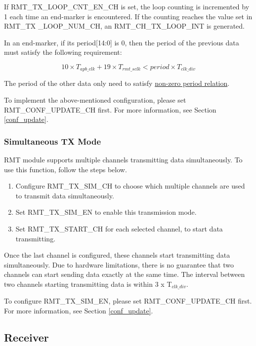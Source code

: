 \documentclass[main\_\_EN.tex]{subfiles}
\begin{document}
If RMT\_TX\_LOOP\_CNT\_EN\_CH is set, the loop counting is incremented by 1 each time an end-marker is encountered. If the counting reaches the value set in RMT\_TX \_LOOP\_NUM\_CH, an RMT\_CH\_TX\_LOOP\_INT is generated. 

In an end-marker, if its period[14:0] is 0, then the period of the previous data must satisfy the following requirement:

\begin{equation}
10 \times T_{apb\_clk} + 19 \times T_{rmt\_sclk} < period \times T_{clk\_div}
\end{equation}

The period of the other data only need to satisfy \hyperref[eq:rmt-period-value]{non-zero period relation}.

To implement the above-mentioned configuration, please set RMT\_CONF\_UPDATE\_CH first. For more information, see Section \ref{conf_update}.

\subsubsection{Simultaneous TX Mode}

RMT module supports multiple channels transmitting data simultaneously. To use this function, follow the steps below.

\begin{enumerate}
    \item Configure RMT\_TX\_SIM\_CH to choose which multiple channels are used to transmit data simultaneously.
    \item Set RMT\_TX\_SIM\_EN to enable this transmission mode.
    \item Set RMT\_TX\_START\_CH for each selected channel, to start data transmitting.
\end{enumerate}

Once the last channel is configured, these channels start transmitting data simultaneously. Due to hardware limitations, there is no guarantee that two channels can start sending data exactly at the same time. The interval between two channels starting transmitting data is within 3 x T$_{clk\_div}$.

To configure RMT\_TX\_SIM\_EN, please set RMT\_CONF\_UPDATE\_CH first. For more information, see Section \ref{conf_update}.



\subsection{Receiver}
\end{document}
